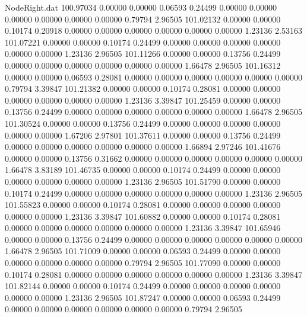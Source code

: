 \begin{filecontents}{NodeRight.dat}
 100.97034    0.00000    0.00000     0.06593    0.24499    0.00000    0.00000    0.00000    0.00000    0.00000    0.00000    0.79794    2.96505
 101.02132    0.00000    0.00000     0.10174    0.20918    0.00000    0.00000    0.00000    0.00000    0.00000    0.00000    1.23136    2.53163
 101.07221    0.00000    0.00000     0.10174    0.24499    0.00000    0.00000    0.00000    0.00000    0.00000    0.00000    1.23136    2.96505
 101.11266    0.00000    0.00000     0.13756    0.24499    0.00000    0.00000    0.00000    0.00000    0.00000    0.00000    1.66478    2.96505
 101.16312    0.00000    0.00000     0.06593    0.28081    0.00000    0.00000    0.00000    0.00000    0.00000    0.00000    0.79794    3.39847
 101.21382    0.00000    0.00000     0.10174    0.28081    0.00000    0.00000    0.00000    0.00000    0.00000    0.00000    1.23136    3.39847
 101.25459    0.00000    0.00000     0.13756    0.24499    0.00000    0.00000    0.00000    0.00000    0.00000    0.00000    1.66478    2.96505
 101.30524    0.00000    0.00000     0.13756    0.24499    0.00000    0.00000    0.00000    0.00000    0.00000    0.00000    1.67206    2.97801
 101.37611    0.00000    0.00000     0.13756    0.24499    0.00000    0.00000    0.00000    0.00000    0.00000    0.00000    1.66894    2.97246
 101.41676    0.00000    0.00000     0.13756    0.31662    0.00000    0.00000    0.00000    0.00000    0.00000    0.00000    1.66478    3.83189
 101.46735    0.00000    0.00000     0.10174    0.24499    0.00000    0.00000    0.00000    0.00000    0.00000    0.00000    1.23136    2.96505
 101.51790    0.00000    0.00000     0.10174    0.24499    0.00000    0.00000    0.00000    0.00000    0.00000    0.00000    1.23136    2.96505
 101.55823    0.00000    0.00000     0.10174    0.28081    0.00000    0.00000    0.00000    0.00000    0.00000    0.00000    1.23136    3.39847
 101.60882    0.00000    0.00000     0.10174    0.28081    0.00000    0.00000    0.00000    0.00000    0.00000    0.00000    1.23136    3.39847
 101.65946    0.00000    0.00000     0.13756    0.24499    0.00000    0.00000    0.00000    0.00000    0.00000    0.00000    1.66478    2.96505
 101.71009    0.00000    0.00000     0.06593    0.24499    0.00000    0.00000    0.00000    0.00000    0.00000    0.00000    0.79794    2.96505
 101.77090    0.00000    0.00000     0.10174    0.28081    0.00000    0.00000    0.00000    0.00000    0.00000    0.00000    1.23136    3.39847
 101.82144    0.00000    0.00000     0.10174    0.24499    0.00000    0.00000    0.00000    0.00000    0.00000    0.00000    1.23136    2.96505
 101.87247    0.00000    0.00000     0.06593    0.24499    0.00000    0.00000    0.00000    0.00000    0.00000    0.00000    0.79794    2.96505

\end{filecontents}
